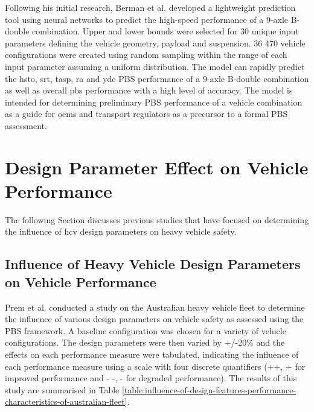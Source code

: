 Following his initial research, Berman et al. \cite{Berman2016} developed a lightweight prediction tool using neural networks to predict the high-speed performance of a 9-axle B-double combination. Upper and lower bounds were selected for 30 unique input parameters defining the vehicle geometry, payload and suspension. 36 470 vehicle configurations were created using random sampling within the range of each input parameter assuming a uniform distribution. The model can rapidly predict the \gls{hsto}, \gls{srt}, \gls{tasp}, \gls{ra} and \gls{ydc} PBS performance of a 9-axle B-double combination as well as overall \gls{pbs} performance with a high level of accuracy. The model is intended for determining preliminary PBS performance of a vehicle combination as a guide for \glspl{oem} and transport regulators as a precursor to a formal PBS assessment.

\section{Design Parameter Effect on Vehicle Performance}\label{section:design-parameter-effect-on-vehicle-performance}
The following Section discusses previous studies that have focused on determining the influence of \gls{hcv} design parameters on heavy vehicle safety.

\subsection{Influence of Heavy Vehicle Design Parameters on Vehicle Performance}\label{section:australian-study-on-the-influence-of-heavy-vehicle-design-parameters}

Prem et al. \cite{Prem2002} conducted a study on the Australian heavy vehicle fleet to determine the influence of various design parameters on vehicle safety as assessed using the PBS framework. A baseline configuration was chosen for a variety of vehicle configurations. The design parameters were then varied by +/-20\% and the effects on each performance measure were tabulated, indicating the influence of each performance measure using a scale with four discrete quantifiers (++, + for improved performance and - -, - for degraded performance). The results of this study are summarised in Table \ref{table:influence-of-design-features-performance-characteristics-of-australian-fleet}.

